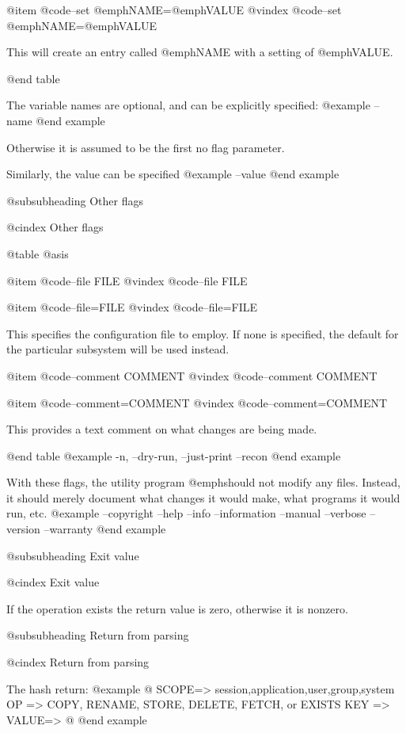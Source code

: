 @item @code{--set} @emph{NAME}=@emph{VALUE}
@vindex @code{--set} @emph{NAME}=@emph{VALUE}

This will create an entry called @emph{NAME} with a setting of @emph{VALUE}.

@end table

The variable names are optional, and can be explicitly specified:
@example
        --name
@end example

Otherwise it is assumed to be the first no flag parameter.

Similarly, the value can be specified
@example
        --value
@end example

@subsubheading Other flags

@cindex Other flags

@table @asis

@item @code{--file }FILE
@vindex @code{--file }FILE

@item @code{--file=}FILE
@vindex @code{--file=}FILE

This specifies the configuration file to employ.  If none is specified, the
default for the particular subsystem will be used instead.  

@item @code{--comment }COMMENT
@vindex @code{--comment }COMMENT

@item @code{--comment=}COMMENT
@vindex @code{--comment=}COMMENT

This provides a text comment on what changes are being made.

@end table
@example
        -n,
        --dry-run,
        --just-print
        --recon
@end example

With these flags, the utility program @emph{should not modify any files}.
Instead, it should merely document what changes it would make, what programs
it would run, etc.
@example
        --copyright
        --help
        --info
        --information
        --manual
        --verbose
        --version
        --warranty
@end example

@subsubheading Exit value

@cindex Exit value

If the operation exists the return value is zero, otherwise it is nonzero.

@subsubheading Return from parsing

@cindex Return from parsing

The hash return:
@example
   @{
      SCOPE=> session,application,user,group,system
      OP  => COPY, RENAME, STORE, DELETE, FETCH, or EXISTS
      KEY =>
      VALUE=>
   @}
@end example

